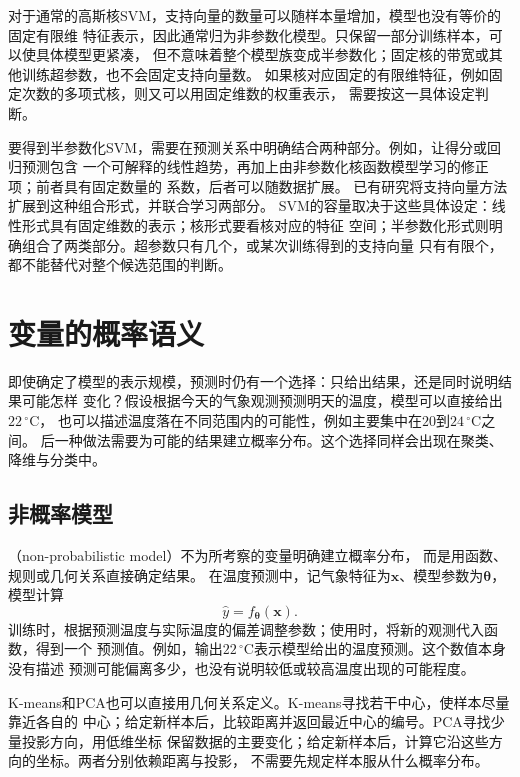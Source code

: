 对于通常的高斯核SVM，支持向量的数量可以随样本量增加，模型也没有等价的固定有限维
特征表示，因此通常归为非参数化模型。只保留一部分训练样本，可以使具体模型更紧凑，
但不意味着整个模型族变成半参数化；固定核的带宽或其他训练超参数，也不会固定支持向量数。
如果核对应固定的有限维特征，例如固定次数的多项式核，则又可以用固定维数的权重表示，
需要按这一具体设定判断。

要得到半参数化SVM，需要在预测关系中明确结合两种部分。例如，让得分或回归预测包含
一个可解释的线性趋势，再加上由非参数化核函数模型学习的修正项；前者具有固定数量的
系数，后者可以随数据扩展。
已有研究将支持向量方法扩展到这种组合形式，并联合学习两部分。
SVM的容量取决于这些具体设定：线性形式具有固定维数的表示；核形式要看核对应的特征
空间；半参数化形式则明确组合了两类部分。超参数只有几个，或某次训练得到的支持向量
只有有限个，都不能替代对整个候选范围的判断。

\section{变量的概率语义}
\label{sec:models-probability}

即使确定了模型的表示规模，预测时仍有一个选择：只给出结果，还是同时说明结果可能怎样
变化？假设根据今天的气象观测预测明天的温度，模型可以直接给出$22\,^{\circ}\mathrm{C}$，
也可以描述温度落在不同范围内的可能性，例如主要集中在$20$到$24\,^{\circ}\mathrm{C}$之间。
后一种做法需要为可能的结果建立概率分布。这个选择同样会出现在聚类、降维与分类中。

\subsection{非概率模型}
\label{sec:models-nonprobabilistic}

（non-probabilistic model）不为所考察的变量明确建立概率分布，
而是用函数、规则或几何关系直接确定结果。
在温度预测中，记气象特征为$\bm{x}$、模型参数为$\bm{\theta}$，模型计算
\begin{equation}
  \hat{y}=f_{\bm{\theta}}(\bm{x}).
  \label{eq:models-point-prediction}
\end{equation}
训练时，根据预测温度与实际温度的偏差调整参数；使用时，将新的观测代入函数，得到一个
预测值。例如，输出$22\,^{\circ}\mathrm{C}$表示模型给出的温度预测。这个数值本身没有描述
预测可能偏离多少，也没有说明较低或较高温度出现的可能程度。

K-means和PCA也可以直接用几何关系定义。K-means寻找若干中心，使样本尽量靠近各自的
中心；给定新样本后，比较距离并返回最近中心的编号。PCA寻找少量投影方向，用低维坐标
保留数据的主要变化；给定新样本后，计算它沿这些方向的坐标。两者分别依赖距离与投影，
不需要先规定样本服从什么概率分布。

